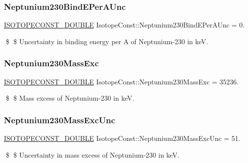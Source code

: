 \subsubsection{\texorpdfstring{Neptunium230\+Bind\+E\+Per\+A\+Unc}{Neptunium230BindEPerAUnc}}
{\footnotesize\ttfamily \mbox{\hyperlink{group___isotope_const-_macros_ga8f45a7272ce02c0b4c65c44636ed719a}{I\+S\+O\+T\+O\+P\+E\+C\+O\+N\+S\+T\+\_\+\+D\+O\+U\+B\+LE}} Isotope\+Const\+::\+Neptunium230\+Bind\+E\+Per\+A\+Unc = 0.}

\$ \$ Uncertainty in binding energy per A of Neptunium-\/230 in keV. \mbox{\label{group___isotope_const-_neptunium-_np230_gae678b446253cc11aefc017a59ac1e30a}} 
\subsubsection{\texorpdfstring{Neptunium230\+Mass\+Exc}{Neptunium230MassExc}}
{\footnotesize\ttfamily \mbox{\hyperlink{group___isotope_const-_macros_ga8f45a7272ce02c0b4c65c44636ed719a}{I\+S\+O\+T\+O\+P\+E\+C\+O\+N\+S\+T\+\_\+\+D\+O\+U\+B\+LE}} Isotope\+Const\+::\+Neptunium230\+Mass\+Exc = 35236.}

\$ \$ Mass excess of Neptunium-\/230 in keV. \mbox{\label{group___isotope_const-_neptunium-_np230_ga462793b7239b30f35d948aa3d76996a8}} 
\subsubsection{\texorpdfstring{Neptunium230\+Mass\+Exc\+Unc}{Neptunium230MassExcUnc}}
{\footnotesize\ttfamily \mbox{\hyperlink{group___isotope_const-_macros_ga8f45a7272ce02c0b4c65c44636ed719a}{I\+S\+O\+T\+O\+P\+E\+C\+O\+N\+S\+T\+\_\+\+D\+O\+U\+B\+LE}} Isotope\+Const\+::\+Neptunium230\+Mass\+Exc\+Unc = 51.}

\$ \$ Uncertainty in mass excess of Neptunium-\/230 in keV. \mbox{\label{group___isotope_const-_neptunium-_np230_gaa80a3c5d545dd76c489c59d8ae83605d}} 
